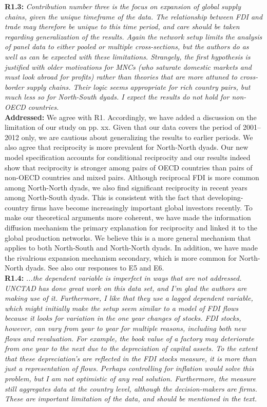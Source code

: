 \documentclass[a4paper,11pt]{texMemo}
\begin{document}
\noindent \textbf{R1.3:} \emph{Contribution number three is the focus on expansion of global supply chains, given the unique timeframe of the data. The relationship between FDI and trade may therefore be unique to this time period, and care should be taken regarding generalization of the results. Again the network setup limits the analysis of panel data to either pooled or multiple cross-sections, but the authors do as well as can be expected with these limitations. Strangely, the first hypothesis is justified with older motivations for MNCs (who saturate domestic markets and must look abroad for profits) rather than theories that are more attuned to cross-border supply chains. Their logic seems appropriate for rich country pairs, but much less so for North-South dyads. I expect the results do not hold for non-OECD countries.}\\

\noindent \textbf{Addressed:}  We agree with R1. Accordingly, we have added a discussion on the limitation of our study on pp. xx. Given that our data covers the period of 2001--2012 only, we are cautious about generalizing the results to earlier periods. We also agree that reciprocity is more prevalent for North-North dyads. Our new model specification accounts for conditional reciprocity and our results indeed show that reciprocity is stronger among pairs of OECD countries than pairs of non-OECD countries and mixed pairs. Although reciprocal FDI is more common among North-North dyads, we also find significant reciprocity in recent years among North-South dyads. This is consistent with the fact that developing-country firms have become increasingly important global investors recently. To make our theoretical arguments more coherent, we have made the information diffusion mechanism the primary explanation for reciprocity and linked it to the global production networks. We believe this is a more general mechanism that applies to both North-South and North-North dyads. In addition, we have made the rivalrious expansion mechanism secondary, which is more common for North-North dyads. See also our responses to E5 and E6.  \\


\noindent \textbf{R1.4:} \emph{...the dependent variable is imperfect in ways that are not addressed. UNCTAD has done great work on this data set, and I'm glad the authors are making use of it. Furthermore, I like that they use a lagged dependent variable, which might initially make the setup seem similar to a model of FDI flows because it looks for variation in the one year changes of stocks. FDI stocks, however, can vary from year to year for multiple reasons, including both new flows and revaluation. For example, the book value of a factory may deteriorate from one year to the next due to the depreciation of capital assets. To the extent that these depreciation's are reflected in the FDI stocks measure, it is more than just a representation of flows. Perhaps controlling for inflation would solve this problem, but I am not optimistic of any real solution. Furthermore, the measure still aggregates data at the country level, although the decision-makers are firms. These are important limitation of the data, and should be mentioned in the text.}\\
\end{document}
